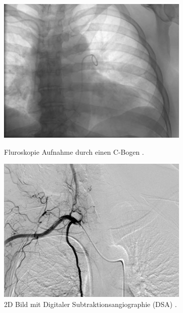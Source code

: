 \begin{figure}[!htb]
	\includegraphics[width=\linewidth]{Content/Pictures/fluroscopy.png}
	\caption{Fluroskopie Aufnahme durch einen C-Bogen \cite{CurrentAndFuture}.}
	\label{fig:fluroscopy}
	\endminipage\hfill
	\includegraphics[width=\linewidth]{Content/Pictures/dsa.png}
	\caption{2D Bild mit Digitaler Subtraktionsangiographie (DSA) \cite{CurrentAndFuture}.}
	\label{fig:dsa}
	\endminipage\hfill

\end{figure}
